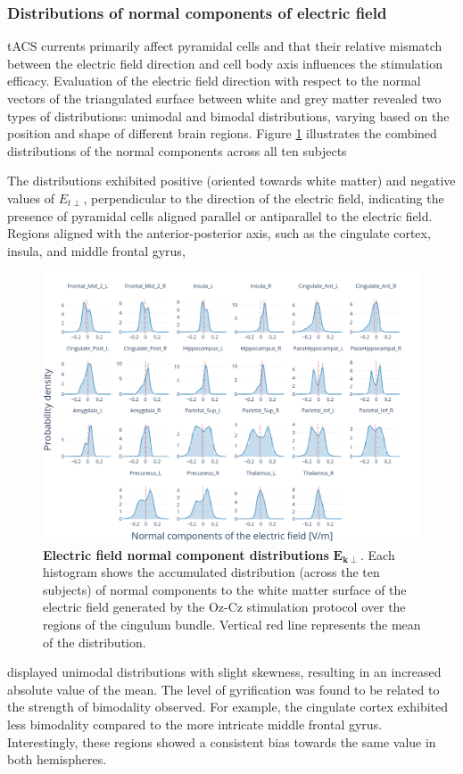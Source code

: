 \documentclass[../main.tex]{subfiles}
\begin{document}
\subsubsection{Distributions of normal components of electric field}
tACS currents primarily affect pyramidal cells and that their relative mismatch between the electric field direction and cell body axis influences the stimulation efficacy.
Evaluation of the electric field direction with respect to the normal vectors of the triangulated surface between white and grey matter revealed two types of distributions: unimodal and bimodal distributions, varying based on the position and shape of different brain regions.
Figure \ref{fig:fig5} illustrates the combined distributions of the normal components across all ten subjects

The distributions exhibited positive (oriented towards white matter) and negative values of $E_{t\perp}$, perpendicular to the direction of the electric field, indicating the presence of pyramidal cells aligned parallel or antiparallel to the electric field.
Regions aligned with the anterior-posterior axis, such as the cingulate cortex, insula, and middle frontal gyrus,
\begin{figure}[!htb]
    \centering
    \includegraphics[width=\textwidth]
    {chapter3/figures/5.png}
    \caption{\textbf{Electric field normal component distributions} $\mathbf{E_{k\perp}}$.
    Each histogram shows the accumulated distribution (across the ten subjects) of normal components to the white matter surface of the electric field generated by the Oz-Cz stimulation protocol over the regions of the cingulum bundle.
    Vertical red line represents the mean of the distribution.}
    \label{fig:fig5}
\end{figure}
displayed unimodal distributions with slight skewness, resulting in an increased absolute value of the mean.
The level of gyrification was found to be related to the strength of bimodality observed.
For example, the cingulate cortex exhibited less bimodality compared to the more intricate middle frontal gyrus. Interestingly, these regions showed a consistent bias towards the same value in both hemispheres. 
\end{document}
